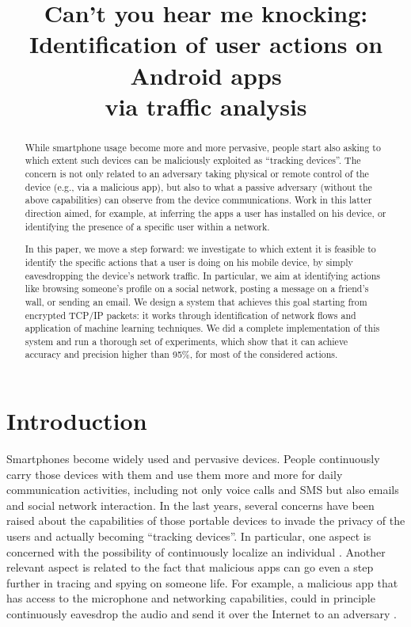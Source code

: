 \documentclass{acm_proc_article-sp}
\title{
Can't you hear me knocking: \\Identification of user actions on Android apps\\via traffic analysis
}
\newcommand{\hilight}[1]{#1}
\begin{document}
\maketitle

\begin{abstract}
While smartphone usage become more and more pervasive, people start also asking to which extent
such devices can be maliciously exploited as ``tracking devices''. The concern is not only related
to an adversary taking physical or remote control of the device (e.g., via a malicious app),
but also to what a passive adversary (without the above capabilities) can observe from the device communications.
Work in this latter direction aimed, for example, at inferring the apps a user has installed
on his device, or identifying the presence of a specific user within a network.

In this paper, we move a step forward: we investigate to which extent it is feasible to identify the specific
actions that a user is doing on his mobile device, by simply eavesdropping the device's network traffic.
In particular, we aim at identifying actions like \hilight{browsing someone's profile on a social network, posting a message on a
friend's wall, or sending an email.}
We design a system that achieves this goal starting from encrypted TCP/IP packets: it works through identification of network 
flows and application of machine learning techniques. We did a complete implementation of this system and
run a thorough set of experiments, which show that it can achieve accuracy and precision higher than 95\%,
for most of the considered actions.
\end{abstract}

\section{Introduction}
\label{Introduction}

Smartphones become widely used and pervasive devices. People continuously carry those devices with them and use them more and more for daily communication activities, including not only voice calls and SMS but also emails and social network interaction.
In the last years, several concerns have been raised about the capabilities of those portable devices to invade the privacy of the users and actually becoming ``tracking devices''. In particular, one aspect is concerned with the possibility of continuously localize an individual \cite{iphonetrackposition:14,angelaTrack:14}.
Another relevant aspect is related to the fact that malicious apps can go even a step further in tracing and spying on someone life. For example, a malicious app that has access to the microphone and networking capabilities, could in principle continuously eavesdrop the audio and send it over the Internet to an adversary \cite{schlegel2011soundcomber}. 
\end{document}

